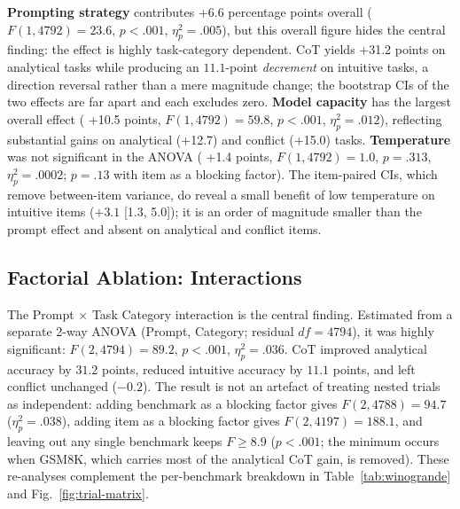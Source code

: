 \documentclass[conference]{IEEEtran}
\begin{document}
\textbf{Prompting strategy} contributes
+6.6 percentage points overall ($F(1, 4792) = 23.6$, $p < .001$, $\eta^2_p = .005$), but this overall figure hides the central finding: the effect is highly task-category dependent. CoT yields
+31.2 points on analytical tasks while producing an
$11.1$-point \textit{decrement} on intuitive tasks, a direction reversal rather than a mere magnitude change; the bootstrap CIs of the two effects are far apart and each excludes zero. \textbf{Model capacity} has the largest overall effect (
+10.5 points, $F(1, 4792) = 59.8$, $p < .001$, $\eta^2_p = .012$), reflecting substantial gains on analytical (+12.7) and conflict (+15.0) tasks. \textbf{Temperature} was not significant in the ANOVA (
+1.4 points, $F(1, 4792) = 1.0$, $p = .313$, $\eta^2_p = .0002$; $p = .13$ with item as a blocking factor). The item-paired CIs, which remove between-item variance, do reveal a small benefit of low temperature on intuitive items ($+3.1$ [1.3, 5.0]); it is an order of magnitude smaller than the prompt effect and absent on analytical and conflict items.

\subsection{Factorial Ablation: Interactions}

The Prompt $\times$ Task Category interaction is the central finding. Estimated from a separate 2-way ANOVA (Prompt, Category; residual $df=4794$), it was highly significant: $F(2, 4794) = 89.2$, $p < .001$, $\eta^2_p = .036$. CoT improved analytical accuracy by $31.2$ points, reduced intuitive accuracy by $11.1$ points, and left conflict unchanged ($-0.2$). The result is not an artefact of treating nested trials as independent: adding benchmark as a blocking factor gives $F(2, 4788) = 94.7$ ($\eta^2_p = .038$), adding item as a blocking factor gives $F(2, 4197) = 188.1$, and leaving out any single benchmark keeps $F \geq 8.9$ ($p < .001$; the minimum occurs when GSM8K, which carries most of the analytical CoT gain, is removed). These re-analyses complement the per-benchmark breakdown in Table~\ref{tab:winogrande} and Fig.~\ref{fig:trial-matrix}.
\end{document}
